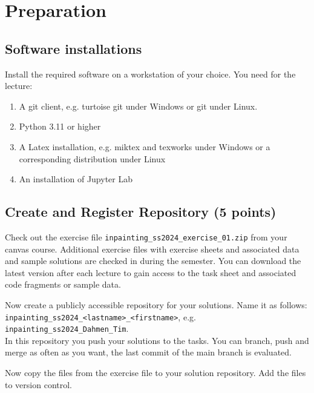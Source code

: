 \def\firstname{Huu Phong}
\def\lastname{Dong}
\def\aufgabenblatt{1}




\thispagestyle{page1} 

\section{Preparation}

\subsection{Software installations}

Install the required software on a workstation of your choice. You need for the lecture:

\begin{enumerate}
\item A git client, e.g. turtoise git under Windows or git under Linux.
\item Python 3.11 or higher 
\item A Latex installation, e.g. miktex and texworks under Windows or a corresponding distribution under Linux
\item An installation of Jupyter Lab
\end{enumerate}

\subsection{Create and Register Repository (5 points)}

Check out the exercise file \texttt{inpainting\_ss2024\_exercise\_01.zip} from your canvas course. Additional exercise files with exercise sheets and associated data and sample solutions are checked in during the semester. You can download the latest version after each lecture to gain access to the task sheet and associated code fragments or sample data.

Now create a publicly accessible repository for your solutions. Name it as follows: \\ 
\texttt{inpainting\_ss2024\_<lastname>\_<firstname>}, e.g. \texttt{inpainting\_ss2024\_Dahmen\_Tim}. \\ 
In this repository you push your solutions to the tasks. You can branch, push and merge as often as you want, the last commit of the main branch is evaluated. 

Now copy the files from the exercise file to your solution repository. Add the files to version control. 

